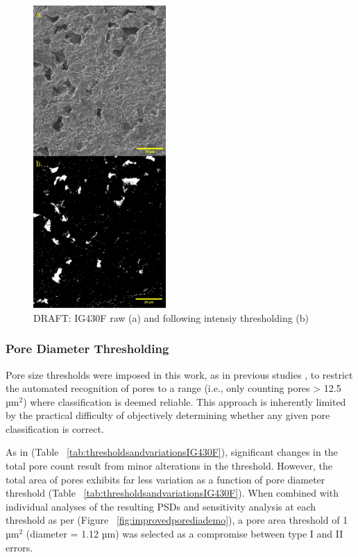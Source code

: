 \documentclass[review]{elsarticle}
\begin{document}
\begin{figure}[!htbp]
    \centering
    \includegraphics[width=0.45\textwidth]{./Media/intensitythresholdexampleig430fdual.png}
    \caption{DRAFT: IG430F raw (a) and following intensiy thresholding (b)}
    \label{fig:dualintensitythreshig430f}
\end{figure}

	\subsubsection{Pore Diameter Thresholding}
    
  Pore size thresholds were imposed in this work, as in previous studies
  \citep{Taylor2016, Huang2019, Kane2011a}, to restrict the automated
  recognition of pores to a range (i.e., only counting pores > 12.5 µm$^2$)
  where classification is deemed reliable. This approach is inherently
  limited by the practical difficulty of objectively determining whether any
  given pore classification is correct.
      
  As  in (Table ~\ref{tab:thresholdsandvariationsIG430F}), significant changes
  in the total pore count result from minor alterations in the threshold.
  However, the total area of pores exhibits far less variation as a function of
  pore diameter threshold (Table ~\ref{tab:thresholdsandvariationsIG430F}). When
  combined with individual analyses of the resulting PSDs and sensitivity
  analysis at each threshold as per (Figure ~\ref{fig:improvedporediademo}), a
  pore area threshold of 1 µm\(^2\) (diameter = 1.12 µm) was selected as a compromise
  between type I and II errors.
\end{document}
